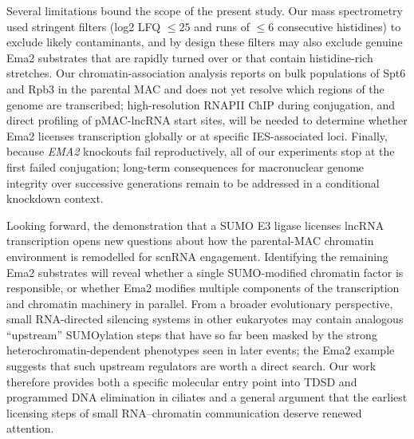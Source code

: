 \documentclass[11pt]{article}
\begin{document}
Several limitations bound the scope of the present study. Our mass
spectrometry used stringent filters (log2 LFQ $\leq 25$ and runs of
$\leq 6$ consecutive histidines) to exclude likely contaminants, and
by design these filters may also exclude genuine Ema2 substrates that
are rapidly turned over or that contain histidine-rich stretches. Our
chromatin-association analysis reports on bulk populations of Spt6 and
Rpb3 in the parental MAC and does not yet resolve which regions of the
genome are transcribed; high-resolution RNAPII ChIP during conjugation,
and direct profiling of pMAC-lncRNA start sites, will be needed to
determine whether Ema2 licenses transcription globally or at specific
IES-associated loci. Finally, because \emph{EMA2} knockouts fail
reproductively, all of our experiments stop at the first failed
conjugation; long-term consequences for macronuclear genome integrity
over successive generations remain to be addressed in a conditional
knockdown context.

Looking forward, the demonstration that a SUMO E3 ligase licenses lncRNA
transcription opens new questions about how the parental-MAC chromatin
environment is remodelled for scnRNA engagement. Identifying the
remaining Ema2 substrates will reveal whether a single SUMO-modified
chromatin factor is responsible, or whether Ema2 modifies multiple
components of the transcription and chromatin machinery in parallel.
From a broader evolutionary perspective, small RNA-directed silencing
systems in other eukaryotes may contain analogous ``upstream''
SUMOylation steps that have so far been masked by the strong
heterochromatin-dependent phenotypes seen in later events; the Ema2
example suggests that such upstream regulators are worth a direct
search. Our work therefore provides both a specific molecular entry
point into TDSD and programmed DNA elimination in ciliates and a
general argument that the earliest licensing steps of small
RNA--chromatin communication deserve renewed attention.


\end{document}
